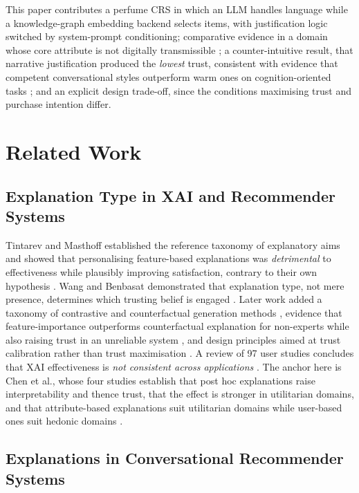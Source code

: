 \documentclass[conference]{IEEEtran}
\begin{document}
This paper contributes a perfume CRS in which an LLM handles language while a
knowledge-graph embedding backend selects items, with justification logic switched by
system-prompt conditioning; comparative evidence in a domain whose core attribute is not
digitally transmissible \cite{chen2024}; a counter-intuitive result, that narrative
justification produced the \textit{lowest} trust, consistent with evidence that competent
conversational styles outperform warm ones on cognition-oriented tasks \cite{libaoku2024};
and an explicit design trade-off, since the conditions maximising trust and purchase
intention differ.

\section{Related Work}
\label{sec:related}

\subsection{Explanation Type in XAI and Recommender Systems}

Tintarev and Masthoff established the reference taxonomy of explanatory aims and showed
that personalising feature-based explanations was \textit{detrimental} to effectiveness
while plausibly improving satisfaction, contrary to their own hypothesis
\cite{tintarev2012}. Wang and Benbasat demonstrated that explanation type, not mere
presence, determines which trusting belief is engaged \cite{wang2007}. Later work added a
taxonomy of contrastive and counterfactual generation methods \cite{stepin2021}, evidence
that feature-importance outperforms counterfactual explanation for non-experts while also
raising trust in an unreliable system \cite{brito2023}, and design principles aimed at
trust calibration rather than trust maximisation \cite{naiseh2021}. A review of 97 user
studies concludes that XAI effectiveness is \textit{not consistent across applications}
\cite{rong2024}. The anchor here is Chen et al., whose four studies establish that post hoc
explanations raise interpretability and thence trust, that the effect is stronger in
utilitarian domains, and that attribute-based explanations suit utilitarian domains while
user-based ones suit hedonic domains \cite{chen2024}.

\subsection{Explanations in Conversational Recommender Systems}
\end{document}
